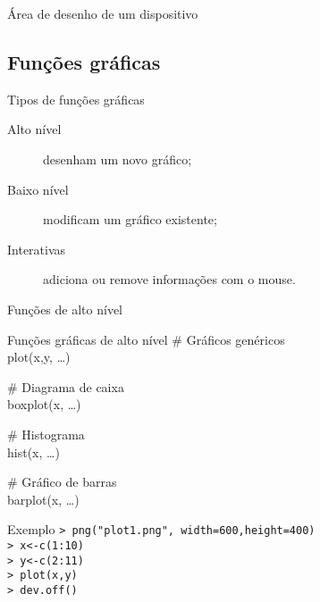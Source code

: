\documentclass{beamer}
\begin{document}
\begin{frame}{Área de desenho de um dispositivo}
\centering
{}
 \end{frame}

\subsection{Funções gráficas}
\begin{frame}{Tipos de funções gráficas}
  \begin{description}
  \item[Alto nível] desenham um novo gráfico;
  \item[Baixo nível] modificam um gráfico existente;
  \item[Interativas] adiciona ou remove informações com o mouse.
  \end{description}
\end{frame}

\begin{frame}{Funções de alto nível}
  \begin{block}{Funções gráficas de alto nível}
\# Gráficos genéricos \\ 
plot(x,y, \dots)\\ \vspace{10pt}

\# Diagrama de caixa \\
boxplot(x, \ldots)\\\vspace{10pt}

\# Histograma\\
hist(x, \ldots)\\ \vspace{10pt}

\# Gráfico de barras\\
barplot(x, \ldots)\\
\end{block}  
\end{frame}

\begin{frame}{Exemplo}
\texttt{> png("plot1.png", width=600,height=400)\\
> x<-c(1:10)\\
> y<-c(2:11)\\
> plot(x,y)\\
> dev.off()\\}
\centering

\end{frame}
\end{document}
